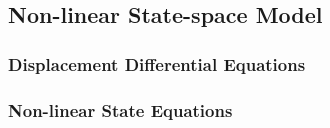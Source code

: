 \subsection{Non-linear State-space Model}

\subsubsection{Displacement Differential Equations}

\subsubsection{Non-linear State Equations}

